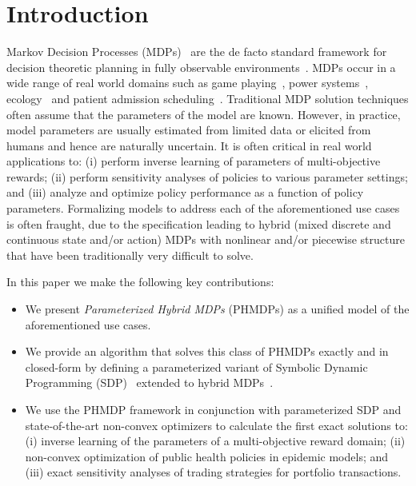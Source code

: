 \section{Introduction}
\label{sec:introduction}

Markov Decision Processes (MDPs)~\parencite{Howard_MIT_1960} are the de facto standard framework for decision theoretic planning in fully observable environments~\parencite{Boutilier_JAIR_1999}. MDPs occur in a wide range of real world domains such as game playing~\parencite{Szita_RL_2012}, power systems~\parencite{Reddy_IJCAI_2011}, ecology~\parencite{Williams_EM_2009} and patient admission scheduling~\parencite{Zhu_AIM_2014}. Traditional MDP solution techniques often assume that the parameters of the model are known. However, in practice, model parameters are usually estimated from limited data or elicited from humans and hence are naturally uncertain. It is often critical in real world applications to: (i) perform inverse learning of parameters of multi-objective rewards; (ii) perform sensitivity analyses of policies to various parameter settings; and (iii) analyze and optimize policy performance as a function of policy parameters.  Formalizing models to address each of the aforementioned use cases is often fraught, due to the specification leading to hybrid (mixed discrete and continuous state and/or action) MDPs with nonlinear and/or piecewise structure that have been traditionally very difficult to solve.

In this paper we make the following key contributions:
\begin{itemize}
\item We present {\it Parameterized Hybrid MDPs} (PHMDPs) as a unified model of the aforementioned use cases.
\item We provide an algorithm that solves this class of PHMDPs exactly and in closed-form by defining a parameterized variant of Symbolic Dynamic Programming (SDP)~\cite{Boutilier_IJCAI_2001} extended to hybrid MDPs~\cite{Sanner_UAI_2011}. 
\item We use the PHMDP framework in conjunction with parameterized SDP and state-of-the-art non-convex optimizers to calculate the first exact solutions to: (i) inverse learning of the parameters of a multi-objective reward domain; (ii) non-convex optimization of public health policies in epidemic models; and (iii) exact sensitivity analyses of trading strategies for portfolio transactions. 
\end{itemize}

